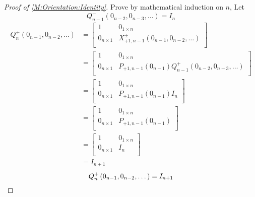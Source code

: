 \documentclass[../methodology.tex]{subfiles}
\begin{document}
\begin{proof}[Proof of \cref{M:Orientation:Identity}]
    Prove by mathematical induction on \(n\),
    Let
    \begin{equation}\label{M:Orientation:Set:Identity:Proof:Induction}
        Q^{+}_{n-1}\left(0_{n-2}, 0_{n-3},\dots\right)=I_n
    \end{equation}
    \begin{align*}
        Q^{+}_n\left(0_{n-1}, 0_{n-2},\dots\right)
         & =
        \begin{bmatrix}
            1             & 0_{1\times n}                                      \\
            0_{n\times 1} & X^{\pm}_{+1,n-1}\left(0_{n-1},0_{n-2},\dots\right) \\
        \end{bmatrix}                           \\
         & =
        \begin{bmatrix}
            1             & 0_{1\times n}                                                                \\
            0_{n\times 1} & P_{+1,n-1}\left(0_{n-1}\right)Q^{+}_{n-1}\left(0_{n-2}, 0_{n-3},\dots\right) \\
        \end{bmatrix} \\
         & =
        \begin{bmatrix}
            1             & 0_{1\times n}                      \\
            0_{n\times 1} & P_{+1,n-1}\left(0_{n-1}\right) I_n \\
        \end{bmatrix}                                           \\
         & =
        \begin{bmatrix}
            1             & 0_{1\times n}                  \\
            0_{n\times 1} & P_{+1,n-1}\left(0_{n-1}\right) \\
        \end{bmatrix}                                               \\
         & =
        \begin{bmatrix}
            1             & 0_{1\times n} \\
            0_{n\times 1} & I_{n}         \\
        \end{bmatrix}                                                                \\
         & =
        I_{n+1}
    \end{align*}
    \[
        Q^{+}_n
        \left(0_{n-1}, 0_{n-2},\dots\right)
        =
        I_{n+1}
        \qedhere
    \]
\end{proof}
\end{document}
